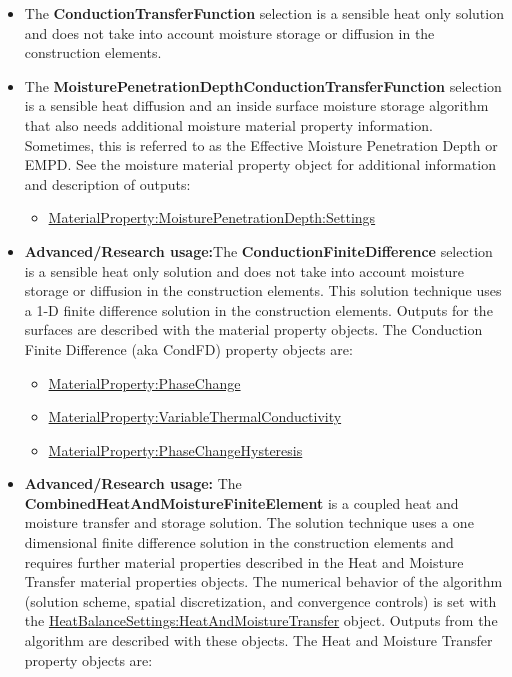 \begin{itemize}
    \item
    The \textbf{ConductionTransferFunction} selection is a sensible heat only solution and does not take into account moisture storage or diffusion in the construction elements.
    \item
    The \textbf{MoisturePenetrationDepthConductionTransferFunction} selection is a sensible heat diffusion and an inside surface moisture storage algorithm that also needs additional moisture material property information. Sometimes, this is referred to as the Effective Moisture Penetration Depth or EMPD. See the moisture material property object for additional information and description of outputs:
    \begin{itemize}
        \item
        \hyperref[materialpropertymoisturepenetrationdepthsettings]{MaterialProperty:MoisturePenetrationDepth:Settings}
    \end{itemize}
    \item
    \textbf{Advanced/Research usage:}The \textbf{ConductionFiniteDifference} selection is a sensible heat only solution and does not take into account moisture storage or diffusion in the construction elements. This solution technique uses a 1-D finite difference solution in the construction elements. Outputs for the surfaces are described with the material property objects. The Conduction Finite Difference (aka CondFD) property objects are:
    \begin{itemize}
        \item
        \hyperref[materialpropertyphasechange]{MaterialProperty:PhaseChange}
        \item
        \hyperref[materialpropertyvariablethermalconductivity]{MaterialProperty:VariableThermalConductivity}
        \item
        \hyperref[materialpropertyphasechangehysteresis]{MaterialProperty:PhaseChangeHysteresis}
    \end{itemize}
    \item
    \textbf{Advanced/Research usage:} The \textbf{CombinedHeatAndMoistureFiniteElement} is a coupled heat and moisture transfer and storage solution. The solution technique uses a one dimensional finite difference solution in the construction elements and requires further material properties described in the Heat and Moisture Transfer material properties objects. The numerical behavior of the algorithm (solution scheme, spatial discretization, and convergence controls) is set with the \hyperref[heatbalancesettingsheatandmoisturetransfer]{HeatBalanceSettings:HeatAndMoistureTransfer} object. Outputs from the algorithm are described with these objects. The Heat and Moisture Transfer property objects are:

\end{itemize}
